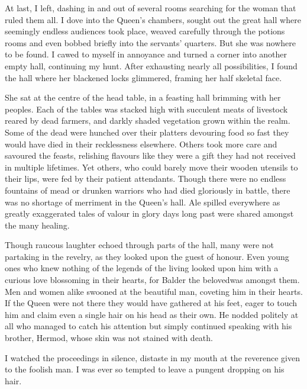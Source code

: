 At last, I left, dashing in and out of several rooms searching for the woman that ruled them all. I dove into the Queen's chambers, sought out the great hall where seemingly endless audiences took place, weaved carefully through the potions rooms and even bobbed briefly into the servants' quarters. But she was nowhere to be found. I cawed to myself in annoyance and turned a corner into another empty hall, continuing my hunt. After exhausting nearly all possibilities, I found the hall where her blackened locks glimmered, framing her half skeletal face.


She sat at the centre of the head table, in a feasting hall brimming with her peoples. Each of the tables was stacked high with succulent meats of livestock reared by dead farmers, and darkly shaded vegetation grown within the realm. Some of the dead were hunched over their platters devouring food so fast they would have died in their recklessness elsewhere. Others took more care and savoured the feasts, relishing flavours like they were a gift they had not received in multiple lifetimes. Yet others, who could barely move their wooden utensils to their lips, were fed by their patient attendants. Though there were no endless fountains of mead or drunken warriors who had died gloriously in battle, there was no shortage of merriment in the Queen's hall. Ale spilled everywhere as greatly exaggerated tales of valour in glory days long past were shared amongst the many healing.

Though raucous laughter echoed through parts of the hall, many were not partaking in the revelry, as they looked upon the guest of honour. Even young ones who knew nothing of the legends of the living looked upon him with a curious love blossoming in their hearts, for Balder the beloved\footnotemark[1] was amongst them. Men and women alike swooned at the beautiful man, coveting him in their hearts. If the Queen were not there they would have gathered at his feet, eager to touch him and claim even a single hair on his head as their own.  He nodded politely at all who managed to catch his attention but simply continued speaking with his brother, Hermod, whose skin was not stained with death.

I watched the proceedings in silence, distaste in my mouth at the reverence given to the foolish man. I was ever so tempted to leave a pungent dropping on his hair. 

